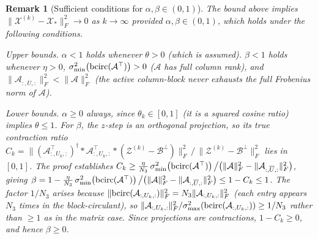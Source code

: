 \documentclass[11pt]{article}
\newtheorem{remark}[theorem]{Remark}
\def\fm#1{\mathcal{#1}}
\begin{document}
\begin{remark}[Sufficient conditions for $\alpha,\beta\in(0,1)$]
\label{rem:alpha-beta}
The bound above implies $\|\fm X^{(k)}-\fm X_\ast\|_F^2\to 0$ as $k\to\infty$
provided $\alpha,\beta\in(0,1)$, which holds under the following conditions.

\textit{Upper bounds.}
$\alpha<1$ holds whenever $\theta>0$ (which is assumed).
$\beta<1$ holds whenever $\eta>0$,
$\sigma_{\min}^2\!\left(\bcirc(\fm A^\top)\right)>0$ ($\fm A$ has full column rank),
and $\|\fm A_{:,\overline{U},:}\|_F^2<\|\fm A\|_F^2$ (the active column-block
never exhausts the full Frobenius norm of $\fm A$).

\textit{Lower bounds.}
$\alpha\geq 0$ always, since $\theta_k\in[0,1]$ (it is a squared cosine ratio) implies $\theta\leq 1$.
For $\beta$, the $z$-step is an orthogonal projection, so its true contraction
ratio $C_k = \|\left(\fm A_{:,U_k,:}^\top\right)^\dagger *\fm A_{:,U_k,:}^\top *
(\fm Z^{(k)}-\fm B^\perp)\|_F^2\,\big/\,\|\fm Z^{(k)}-\fm B^\perp\|_F^2$
lies in $[0,1]$.
The proof establishes
$C_k\geq\frac{\eta}{N_3}\,\sigma_{\min}^2\!\left(\bcirc(\fm A^\top)\right)\big/
\bigl(\|\fm A\|_F^2-\|\fm A_{:,\overline{U},:}\|_F^2\bigr)$,
giving $\beta = 1-\frac{\eta}{N_3}\,\sigma_{\min}^2\!\left(\bcirc(\fm A^\top)\right)\big/
\bigl(\|\fm A\|_F^2-\|\fm A_{:,\overline{U},:}\|_F^2\bigr)\leq 1-C_k\leq 1$.
The factor $1/N_3$ arises because $\|\bcirc(\fm A_{:,U_k,:})\|_F^2 = N_3\|\fm A_{:,U_k,:}\|_F^2$
(each entry appears $N_3$ times in the block-circulant), so
$\|\fm A_{:,U_k,:}\|_F^2/\sigma_{\max}^2(\bcirc(\fm A_{:,U_k,:}))\geq 1/N_3$
rather than $\geq 1$ as in the matrix case.
Since projections are contractions, $1-C_k\geq 0$, and hence $\beta\geq 0$.
\end{remark}
\end{document}
